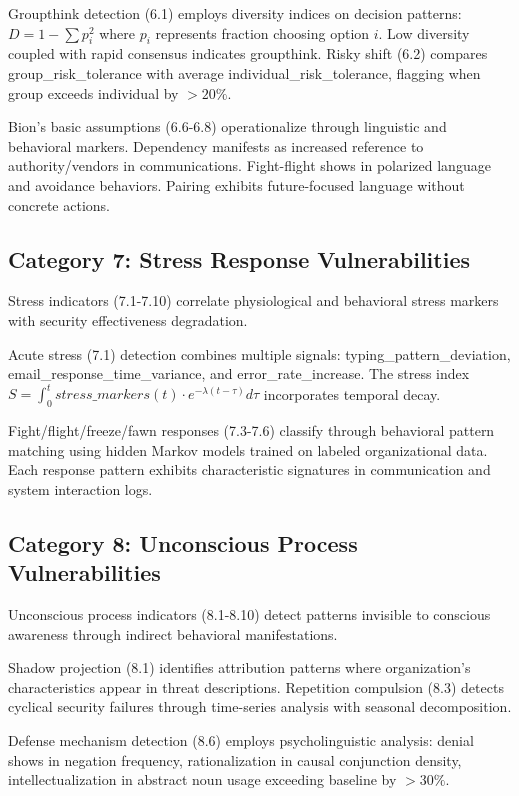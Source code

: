 \documentclass[10pt, twocolumn]{article}
\begin{document}
Groupthink detection (6.1) employs diversity indices on decision patterns: $D = 1 - \sum p_i^2$ where $p_i$ represents fraction choosing option $i$. Low diversity coupled with rapid consensus indicates groupthink. Risky shift (6.2) compares group\_risk\_tolerance with average individual\_risk\_tolerance, flagging when group exceeds individual by $>20\%$.

Bion's basic assumptions (6.6-6.8) operationalize through linguistic and behavioral markers. Dependency manifests as increased reference to authority/vendors in communications. Fight-flight shows in polarized language and avoidance behaviors. Pairing exhibits future-focused language without concrete actions.

\subsection{Category 7: Stress Response Vulnerabilities}

Stress indicators (7.1-7.10) correlate physiological and behavioral stress markers with security effectiveness degradation.

Acute stress (7.1) detection combines multiple signals: typing\_pattern\_deviation, email\_response\_time\_variance, and error\_rate\_increase. The stress index $S = \int_0^t stress\_markers(t) \cdot e^{-\lambda(t-\tau)} d\tau$ incorporates temporal decay.

Fight/flight/freeze/fawn responses (7.3-7.6) classify through behavioral pattern matching using hidden Markov models trained on labeled organizational data. Each response pattern exhibits characteristic signatures in communication and system interaction logs.

\subsection{Category 8: Unconscious Process Vulnerabilities}

Unconscious process indicators (8.1-8.10) detect patterns invisible to conscious awareness through indirect behavioral manifestations.

Shadow projection (8.1) identifies attribution patterns where organization's characteristics appear in threat descriptions. Repetition compulsion (8.3) detects cyclical security failures through time-series analysis with seasonal decomposition.

Defense mechanism detection (8.6) employs psycholinguistic analysis: denial shows in negation frequency, rationalization in causal conjunction density, intellectualization in abstract noun usage exceeding baseline by $>30\%$.
\end{document}
